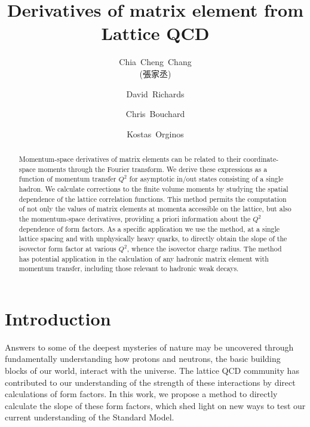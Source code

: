\documentclass[prd,aps,twocolumn,superscriptaddress,tightenlines,nofootinbib,floatfix,preprintnumbers,10pt]{revtex4-1}
\newcommand{\mydate}{\ \today \ - \number\hour :\number\minute}
\begin{document}
\title{Derivatives of matrix element from Lattice QCD}

\author{Chia~Cheng~Chang \begin{CJK*}{UTF8}{bsmi}(張家丞)\end{CJK*}}
\affiliation{\lblnsd}

\author{David~Richards}
\affiliation{\jlab}

\author{Chris~Bouchard}
\affiliation{\glasgow}

\author{Kostas~Orginos}
\affiliation{\wm}
\affiliation{\jlab}





\begin{abstract}
Momentum-space derivatives of matrix elements can be related to their coordinate-space moments through the Fourier transform. We derive these expressions as a function of momentum transfer $Q^2$ for asymptotic in/out states consisting of a single hadron. We calculate corrections to the finite volume moments by studying the spatial dependence of the lattice correlation functions. This method permits the computation of not only the values of matrix elements at momenta accessible on the lattice, but also the momentum-space derivatives, providing a priori information about the $Q^2$ dependence of form factors. As a specific application we use the method, at a single lattice spacing and with unphysically heavy quarks, to directly obtain the slope of the isovector form factor at various $Q^2$, whence the isovector charge radius. The method has potential application in the calculation of any hadronic matrix element with momentum transfer, including those relevant to hadronic weak decays.
\end{abstract}
\maketitle



\section{Introduction\label{sec:intro}}
Answers to some of the deepest mysteries of nature may be uncovered through fundamentally understanding how protons and neutrons, the basic building blocks of our world, interact with the universe. The lattice QCD community has contributed to our understanding of the strength of these interactions by direct calculations of form factors. In this work, we propose a method to directly calculate the slope of these form factors, which shed light on new ways to test our current understanding of the Standard Model.
\end{document}
